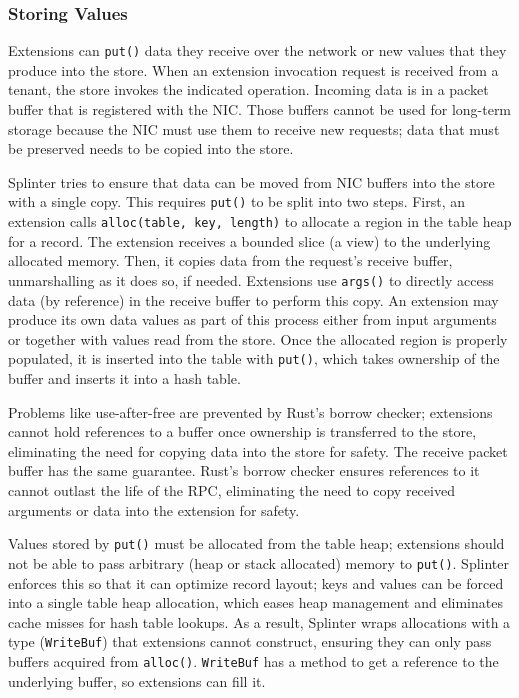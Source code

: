 \subsubsection{Storing Values}

Extensions can \texttt{put()} data they receive over the network
  or new values that they produce into the store.
When an extension invocation request is received from a tenant, the store invokes the indicated operation.
Incoming data is in a packet buffer that is registered with the NIC.
Those buffers cannot be used for long-term storage
  because the NIC must use them to receive new requests;
data that must be preserved needs to be copied into the store.

Splinter tries to ensure that data can be moved from NIC buffers into the
    store with a single copy.
This requires \texttt{put()} to be split into two steps.
First, an extension calls \texttt{alloc(table, key, length)} to allocate a region in
  the table heap for a record.
The extension receives a bounded slice (a view) to the underlying allocated
  memory.
Then, it copies data from the request's receive buffer, unmarshalling
    as it does so, if needed.
Extensions use \texttt{args()} to directly access data (by
  reference) in the receive buffer to perform this copy.
An extension may produce its own data values as part of this process
    either from input arguments or together with values read from the store.
Once the allocated region is properly populated, it is inserted into the
  table with \texttt{put()},
which takes ownership of the buffer and inserts it into a hash table.

Problems like use-after-free are prevented by Rust's borrow checker;
extensions cannot hold references to a buffer once ownership is
  transferred to the store, eliminating the need for copying data into the
  store for safety.
The receive packet buffer has the same guarantee.
Rust's borrow checker ensures references to it cannot outlast
  the life of the RPC, eliminating the need to copy
  received arguments or data into the extension for safety.

Values stored by \texttt{put()} must be allocated from the table heap;
  extensions should not be able to pass arbitrary (heap or stack allocated)
  memory to \texttt{put()}.
Splinter enforces this so that it can optimize record layout;
keys and values can be forced into a single table heap allocation, which
  eases heap management and eliminates cache misses for hash table lookups.
As a result, Splinter wraps allocations
  with a type (\texttt{WriteBuf}) that extensions cannot construct,
  ensuring they can
  only pass buffers acquired from \texttt{alloc()}.
\texttt{WriteBuf} has a method to get a reference to the
  underlying buffer, so extensions can fill it.

